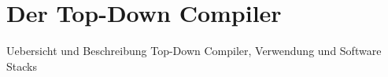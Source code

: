\chapter{Der Top-Down Compiler}
\label{chapter}

Uebersicht und Beschreibung Top-Down Compiler, Verwendung und Software Stacks
